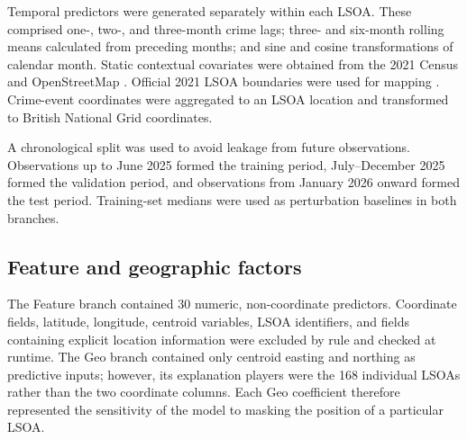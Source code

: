 Temporal predictors were generated separately within each LSOA. These comprised one-, two-, and three-month crime lags; three- and six-month rolling means calculated from preceding months; and sine and cosine transformations of calendar month. Static contextual covariates were obtained from the 2021 Census and OpenStreetMap \cite{census2021,openstreetmap}. Official 2021 LSOA boundaries were used for mapping \cite{ons_lsoa2021}. Crime-event coordinates were aggregated to an LSOA location and transformed to British National Grid coordinates.

A chronological split was used to avoid leakage from future observations. Observations up to June 2025 formed the training period, July--December 2025 formed the validation period, and observations from January 2026 onward formed the test period. Training-set medians were used as perturbation baselines in both branches.

\subsection{Feature and geographic factors}
\label{sec:hull_factors}

The Feature branch contained 30 numeric, non-coordinate predictors. Coordinate fields, latitude, longitude, centroid variables, LSOA identifiers, and fields containing explicit location information were excluded by rule and checked at runtime. The Geo branch contained only centroid easting and northing as predictive inputs; however, its explanation players were the 168 individual LSOAs rather than the two coordinate columns. Each Geo coefficient therefore represented the sensitivity of the model to masking the position of a particular LSOA.


